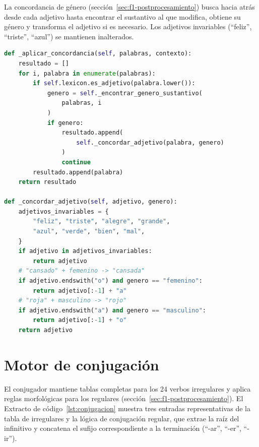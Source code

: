 La concordancia de género (sección~\ref{sec:f1-postprocesamiento}) busca hacia atrás desde cada adjetivo hasta encontrar el sustantivo al que modifica, obtiene su género y transforma el adjetivo si es necesario. Los adjetivos invariables (``feliz'', ``triste'', ``azul'') se mantienen inalterados.

\begin{lstlisting}[language=Python,caption={Concordancia de género en adjetivos (\texttt{postprocessor.py}).},label={lst:concordancia},basicstyle=\ttfamily\small,xleftmargin=1cm]
def _aplicar_concordancia(self, palabras, contexto):
    resultado = []
    for i, palabra in enumerate(palabras):
        if self.lexicon.es_adjetivo(palabra.lower()):
            genero = self._encontrar_genero_sustantivo(
                palabras, i
            )
            if genero:
                resultado.append(
                    self._concordar_adjetivo(palabra, genero)
                )
                continue
        resultado.append(palabra)
    return resultado

def _concordar_adjetivo(self, adjetivo, genero):
    adjetivos_invariables = {
        "feliz", "triste", "alegre", "grande",
        "azul", "verde", "bien", "mal",
    }
    if adjetivo in adjetivos_invariables:
        return adjetivo
    # "cansado" + femenino -> "cansada"
    if adjetivo.endswith("o") and genero == "femenino":
        return adjetivo[:-1] + "a"
    # "roja" + masculino -> "rojo"
    if adjetivo.endswith("a") and genero == "masculino":
        return adjetivo[:-1] + "o"
    return adjetivo
\end{lstlisting}

\section{Motor de conjugación}

El conjugador mantiene tablas completas para los 24 verbos irregulares y aplica reglas morfológicas para los regulares (sección~\ref{sec:f1-postprocesamiento}). El Extracto de código~\ref{lst:conjugacion} muestra tres entradas representativas de la tabla de irregulares y la lógica de conjugación regular, que extrae la raíz del infinitivo y concatena el sufijo correspondiente a la terminación (``-ar'', ``-er'', ``-ir'').

